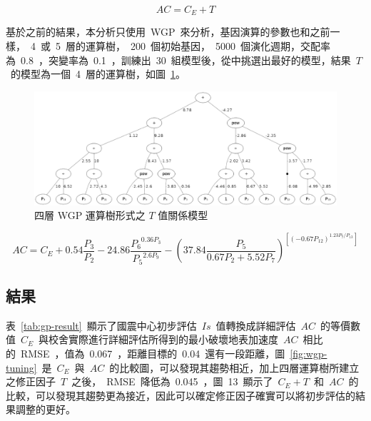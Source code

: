 \begin{equation} AC = C_E + T  \label{eq:AC}\end{equation}

基於之前的結果，本分析只使用~WGP~來分析，基因演算的參數也和之前一樣，~4~或~5~層的運算樹，~200~個初始基因，~5000~個演化週期，交配率為~0.8~，突變率為~0.1~，訓練出~30~組模型後，從中挑選出最好的模型，結果~$T$~的模型為一個~4~層的運算樹，如圖~\ref{fig:4LWGPTuning}。

\begin{figure}[hbtp]
  \begin{center}
    \includegraphics[width=1.0\textwidth]{figures/4-layer-wgp-tuning.png}
    \caption{四層 WGP 運算樹形式之 $T$ 值關係模型}
    \label{fig:4LWGPTuning}
  \end{center}
\end{figure}


\begin{equation} AC = C_E + 0.54 \dfrac{P_3}{P_2} - 24.86 \dfrac{ {P_6}^{0.36P_3} }{ {P_5}^{2.6P_9} } - ( 37.84 \dfrac{P_5}{0.67P_2 + 5.52P_7} )^{\left[ (-0.67 P_{12})^{1.23P_7/P_{13}} \right]} \label{eq:WGP_AC_IS}\end{equation}


\subsection{結果}

表~\ref{tab:gp-result}~顯示了國震中心初步評估~$Is$~值轉換成詳細評估~$AC$~的等價數值~$C_E$~與校舍實際進行詳細評估所得到的最小破壞地表加速度~$AC$~相比的~RMSE~，值為~0.067~，距離目標的~0.04~還有一段距離，圖~\ref{fig:wgp-tuning}~是~$C_E$~與~$AC$~的比較圖，可以發現其趨勢相近，加上四層運算樹所建立之修正因子~$T$~之後，~RMSE~降低為~0.045~，圖~13~顯示了~$C_E + T$~和~$AC$~的比較，可以發現其趨勢更為接近，因此可以確定修正因子確實可以將初步評估的結果調整的更好。


